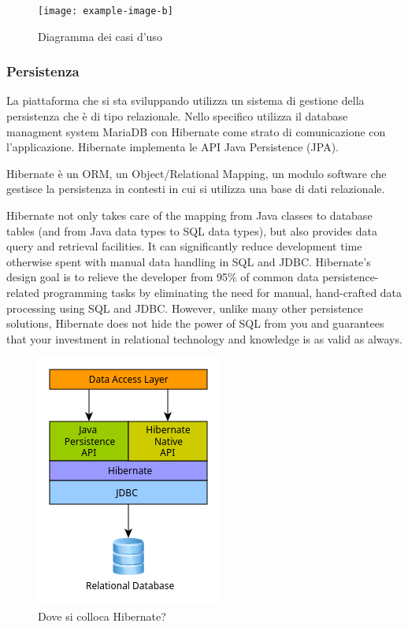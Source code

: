 \documentclass[a4paper,11pt]{article}
\begin{document}
\begin{figure}[H]
  \texttt{[image: example-image-b]}
  \caption{Diagramma dei casi d'uso}
  \label{fig:diagrammacasi}
\end{figure}


\subsubsection{Persistenza}

La piattaforma che si sta sviluppando utilizza un sistema di gestione della persistenza che è di tipo relazionale. Nello specifico utilizza il database managment system MariaDB con Hibernate come strato di comunicazione con l'applicazione. Hibernate implementa le API Java Persistence (JPA).

Hibernate è un ORM, un Object/Relational Mapping, un modulo software che gestisce la persistenza in contesti in cui si utilizza una base di dati relazionale.

Hibernate not only takes care of the mapping from Java classes to database tables (and from Java data types to SQL data types), but also provides data query and retrieval facilities. It can significantly reduce development time otherwise spent with manual data handling in SQL and JDBC. Hibernate’s design goal is to relieve the developer from 95\% of common data persistence-related programming tasks by eliminating the need for manual, hand-crafted data processing using SQL and JDBC. However, unlike many other persistence solutions, Hibernate does not hide the power of SQL from you and guarantees that your investment in relational technology and knowledge is as valid as always. \cite{jbossHibernateUser}

\begin{figure}[H]
  \centering
  \includegraphics[width=0.4\linewidth]{img/image-3.png}
  \caption{Dove si colloca Hibernate? \cite{jbossHibernateUserArch}}
  \label{fig:architetturahibernate}
\end{figure}
\end{document}
